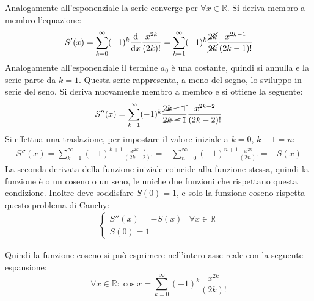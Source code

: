 \documentclass{article}
\numberwithin{equation}{subsection}
\begin{document}
Analogamente all'esponenziale la serie converge per $\forall x\in\mathbb{R}$. Si deriva membro a membro l'equazione:
\begin{gather*}
    S'(x)=\displaystyle\sum_{k=0}^\infty(-1)^k\frac{\mathrm{d}}{\mathrm{d}x}\frac{x^{2k}}{(2k)!}=
    \sum_{k=1}^\infty(-1)^k\frac{\cancel{2k}}{\cancel{2k}}\frac{x^{2k-1}}{(2k-1)!}
\end{gather*}
Analogamente all'esponenziale il termine $a_0$ è una costante, quindi si annulla e la serie parte da $k=1$. Questa serie rappresenta, a meno del segno, lo sviluppo in serie del seno. Si deriva nuovamente membro a membro e si ottiene la seguente:
\begin{gather*}
    S''(x)=\displaystyle\sum_{k=1}^\infty(-1)^k\frac{\cancel{2k-1}}{\cancel{2k-1}}\frac{x^{2k-2}}{(2k-2)!}
\end{gather*}
Si effettua una traslazione, per impostare il valore iniziale a $k=0$, $k-1=n$:
\begin{gather*}
    S''(x)=\displaystyle\sum_{k=1}^\infty(-1)^{k+1}\frac{x^{2k-2}}{(2k-2)!}=
    -\sum_{n=0}^\infty(-1)^{n+1}\frac{x^{2n}}{(2n)!}=-S(x)
\end{gather*}
La seconda derivata della funzione iniziale coincide alla funzione stessa, quindi la funzione è o un coseno o un seno, le uniche due funzioni che rispettano questa condizione. Inoltre deve soddisfare $S(0)=1$, e solo la funzione coseno rispetta questo problema di Cauchy:
\begin{gather*}
    \begin{cases}
        S''(x)=-S(x)&\forall x\in\mathbb{R}\\
        S(0)=1
    \end{cases}
\end{gather*}

Quindi la funzione coseno si può esprimere nell'intero asse reale con la seguente espansione:
\begin{equation}
    \forall x\in\mathbb{R}:\cos x=\displaystyle\sum_{k=0}^\infty (-1)^k\frac{x^{2k}}{(2k)!}
\end{equation}
\end{document}
